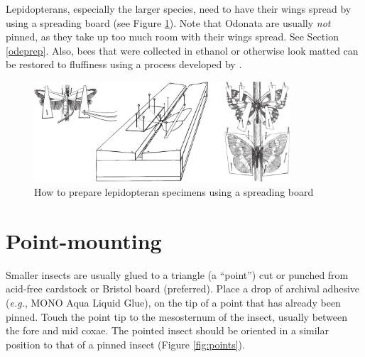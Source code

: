\noindent{}Lepidopterans, especially the larger species, need to have their wings spread by using a spreading board (see Figure \ref{lepspread}). Note that Odonata are usually \textit{not} pinned, as they take up too much room with their wings spread. See Section \ref{odeprep}. Also, bees that were collected in ethanol or otherwise look matted can be restored to fluffiness using a process developed by \cite{droegeBee}.

\begin{figure}[ht!]
	\centering
  \includegraphics[width=0.85\textwidth]{sections/img/specimenPreps/spreadingLeps.pdf}
  \caption{How to prepare lepidopteran specimens using a spreading board \citep[redrawn from Figs. in][]{bhlitem105840ross,south2022butterflies,landry1994technique}}
  \label{lepspread}
\end{figure}

\section{Point-mounting}\label{pointing}
Smaller insects are usually glued to a triangle (a ``point'') cut or punched from acid-free cardstock or Bristol board (preferred). Place a drop of archival adhesive (\textit{e.g.}, MONO Aqua Liquid Glue), on the tip of a point that has already been pinned. Touch the point tip to the mesosternum of the insect, usually between the fore and mid coxae. The pointed insect should be oriented in a similar position to that of a pinned insect (Figure \ref{fig:points}).

